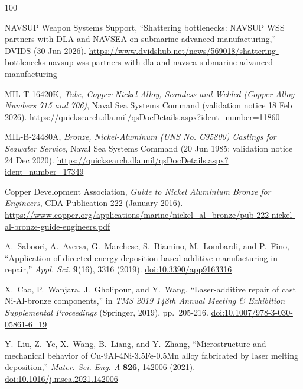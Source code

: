 \documentclass[12pt,letterpaper]{article}
\begin{document}
\clearpage
\setcounter{page}{1}
\renewcommand{\thepage}{R-\arabic{page}}
{}
\begin{thebibliography}{100}
\setlength{\itemsep}{1pt}

NAVSUP Weapon Systems Support, ``Shattering bottlenecks: NAVSUP WSS partners with DLA and NAVSEA on submarine advanced manufacturing,'' DVIDS (30 Jun 2026).
\url{https://www.dvidshub.net/news/569018/shattering-bottlenecks-navsup-wss-partners-with-dla-and-navsea-submarine-advanced-manufacturing}

MIL-T-16420K, \emph{Tube, Copper-Nickel Alloy, Seamless and Welded (Copper Alloy Numbers 715 and 706)}, Naval Sea Systems Command (validation notice 18 Feb 2026).
\url{https://quicksearch.dla.mil/qsDocDetails.aspx?ident_number=11860}

MIL-B-24480A, \emph{Bronze, Nickel-Aluminum (UNS No. C95800) Castings for Seawater Service}, Naval Sea Systems Command (20 Jun 1985; validation notice 24 Dec 2020).
\url{https://quicksearch.dla.mil/qsDocDetails.aspx?ident_number=17349}

Copper Development Association, \emph{Guide to Nickel Aluminium Bronze for Engineers}, CDA Publication 222 (January 2016).
\url{https://www.copper.org/applications/marine/nickel_al_bronze/pub-222-nickel-al-bronze-guide-engineers.pdf}

A.~Saboori, A.~Aversa, G.~Marchese, S.~Biamino, M.~Lombardi, and P.~Fino, ``Application of directed energy deposition-based additive manufacturing in repair,'' \emph{Appl. Sci.} \textbf{9}(16), 3316 (2019).
\href{https://doi.org/10.3390/app9163316}{doi:10.3390/app9163316}

X.~Cao, P.~Wanjara, J.~Gholipour, and Y.~Wang, ``Laser-additive repair of cast Ni-Al-bronze components,'' in \emph{TMS 2019 148th Annual Meeting \& Exhibition Supplemental Proceedings} (Springer, 2019), pp.~205-216.
\href{https://doi.org/10.1007/978-3-030-05861-6_19}{doi:10.1007/978-3-030-05861-6\_19}

Y.~Liu, Z.~Ye, X.~Wang, B.~Liang, and Y.~Zhang, ``Microstructure and mechanical behavior of Cu-9Al-4Ni-3.5Fe-0.5Mn alloy fabricated by laser melting deposition,'' \emph{Mater. Sci. Eng. A} \textbf{826}, 142006 (2021).
\href{https://doi.org/10.1016/j.msea.2021.142006}{doi:10.1016/j.msea.2021.142006}


\end{thebibliography}
\end{document}
